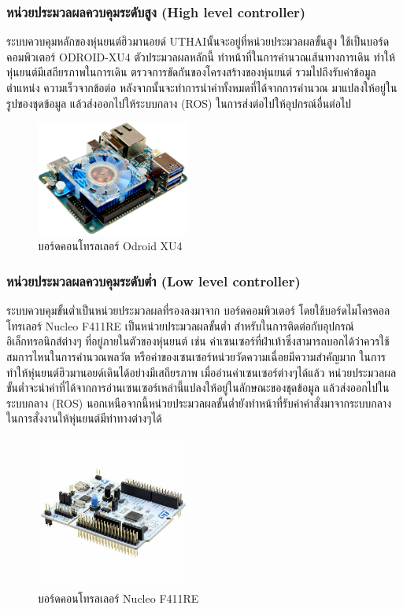 \clearpage
\subsubsection{หน่วยประมวลผลควบคุมระดับสูง (High level controller)}
ระบบควบคุมหลักของหุ่นยนต์ฮิวมานอยด์ UTHAIนั้นจะอยู่ที่หน่วยประมวลผลขั้นสูง ใช้เป็นบอร์ดคอมพิวเตอร์ ODROID-XU4 ตัวประมวลผลหลักนี้
ทำหน้าที่ในการคำนวณเส้นทางการเดิน ทำให้หุ่นยนต์มีเสถียรภาพในการเดิน ตรวจการขัดกันของโครงสร้างของหุ่นยนต์
รวมไปถึงรับค่าข้อมูลตำแหน่ง ความเร็วจากข้อต่อ หลังจากนั้นจะทำการนำค่าทั้งหมดที่ได้จากการคำนวณ
มาแปลงให้อยู่ในรูปของชุดข้อมูล แล้วส่งออกไปให้ระบบกลาง (ROS) ในการส่งต่อไปให้อุปกรณ์อื่นต่อไป

\begin{figure}[ht]
	\centering
	\includegraphics[width=0.45\textwidth]{chapter3/images/odroid_xu4.jpeg}
	\caption{บอร์ดคอนโทรลเลอร์ Odroid XU4}
	\label{fig:controller_xu4}
\end{figure}

\subsubsection{หน่วยประมวลผลควบคุมระดับต่ำ (Low level controller)}
ระบบควบคุมขั้นต่ำเป็นหน่วยประมวลผลที่รองลงมาจาก บอร์ดคอมพิวเตอร์ โดยใช้บอร์ดไมโครคอลโทรเลอร์ Nucleo F411RE
เป็นหน่วยประมวลผลขั้นต่ำ สำหรับในการติดต่อกับอุปกรณ์อิเล็กทรอนิกส์ต่างๆ ที่อยู่ภายในตัวของหุ่นยนต์ เช่น
ค่าเซนเซอร์ที่ฝ่าเท้าซึ่งสามารถบอกได้ว่าควรใช้สมการไหนในการคำนวณพลวัต หรือค่าของเซนเซอร์หน่วยวัดความเฉื่อยมีความสำคัญมาก
ในการทำให้หุ่นยนต์ฮิวมานอยด์เดินได้อย่างมีเสถียรภาพ เมื่ออ่านค่าเซนเซอร์ต่างๆได้แล้ว
หน่วยประมวลผลขั้นต่ำจะนำค่าที่ได้จากการอ่านเซนเซอร์เหล่านี้แปลงให้อยู่ในลักษณะของชุดข้อมูล แล้วส่งออกไปในระบบกลาง (ROS)
นอกเหนือจากนี้หน่วยประมวลผลขั้นต่ำยังทำหน้าที่รับค่าคำสั่งมาจากระบบกลาง ในการสั่งงานให้หุ่นยนต์มีท่าทางต่างๆได้

\begin{figure}[ht]
	\centering
	\includegraphics[width=0.45\textwidth]{chapter3/images/nucleo_f411re.jpeg}
	\caption{บอร์ดคอนโทรลเลอร์ Nucleo F411RE}
	\label{fig:controller_f411re}
\end{figure}


